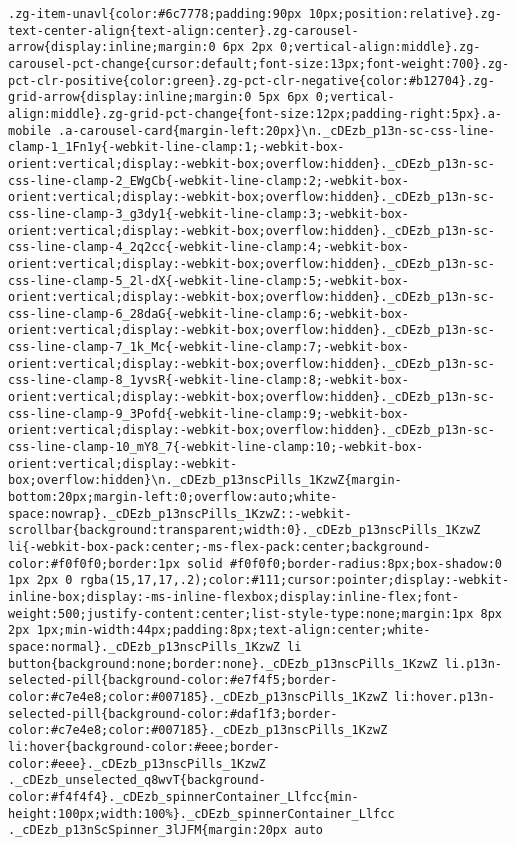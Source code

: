 \documentclass[
]{article}
\begin{document}
\begin{verbatim}
.zg-item-unavl{color:#6c7778;padding:90px 10px;position:relative}.zg-text-center-align{text-align:center}.zg-carousel-arrow{display:inline;margin:0 6px 2px 0;vertical-align:middle}.zg-carousel-pct-change{cursor:default;font-size:13px;font-weight:700}.zg-pct-clr-positive{color:green}.zg-pct-clr-negative{color:#b12704}.zg-grid-arrow{display:inline;margin:0 5px 6px 0;vertical-align:middle}.zg-grid-pct-change{font-size:12px;padding-right:5px}.a-mobile .a-carousel-card{margin-left:20px}\n._cDEzb_p13n-sc-css-line-clamp-1_1Fn1y{-webkit-line-clamp:1;-webkit-box-orient:vertical;display:-webkit-box;overflow:hidden}._cDEzb_p13n-sc-css-line-clamp-2_EWgCb{-webkit-line-clamp:2;-webkit-box-orient:vertical;display:-webkit-box;overflow:hidden}._cDEzb_p13n-sc-css-line-clamp-3_g3dy1{-webkit-line-clamp:3;-webkit-box-orient:vertical;display:-webkit-box;overflow:hidden}._cDEzb_p13n-sc-css-line-clamp-4_2q2cc{-webkit-line-clamp:4;-webkit-box-orient:vertical;display:-webkit-box;overflow:hidden}._cDEzb_p13n-sc-css-line-clamp-5_2l-dX{-webkit-line-clamp:5;-webkit-box-orient:vertical;display:-webkit-box;overflow:hidden}._cDEzb_p13n-sc-css-line-clamp-6_28daG{-webkit-line-clamp:6;-webkit-box-orient:vertical;display:-webkit-box;overflow:hidden}._cDEzb_p13n-sc-css-line-clamp-7_1k_Mc{-webkit-line-clamp:7;-webkit-box-orient:vertical;display:-webkit-box;overflow:hidden}._cDEzb_p13n-sc-css-line-clamp-8_1yvsR{-webkit-line-clamp:8;-webkit-box-orient:vertical;display:-webkit-box;overflow:hidden}._cDEzb_p13n-sc-css-line-clamp-9_3Pofd{-webkit-line-clamp:9;-webkit-box-orient:vertical;display:-webkit-box;overflow:hidden}._cDEzb_p13n-sc-css-line-clamp-10_mY8_7{-webkit-line-clamp:10;-webkit-box-orient:vertical;display:-webkit-box;overflow:hidden}\n._cDEzb_p13nscPills_1KzwZ{margin-bottom:20px;margin-left:0;overflow:auto;white-space:nowrap}._cDEzb_p13nscPills_1KzwZ::-webkit-scrollbar{background:transparent;width:0}._cDEzb_p13nscPills_1KzwZ li{-webkit-box-pack:center;-ms-flex-pack:center;background-color:#f0f0f0;border:1px solid #f0f0f0;border-radius:8px;box-shadow:0 1px 2px 0 rgba(15,17,17,.2);color:#111;cursor:pointer;display:-webkit-inline-box;display:-ms-inline-flexbox;display:inline-flex;font-weight:500;justify-content:center;list-style-type:none;margin:1px 8px 2px 1px;min-width:44px;padding:8px;text-align:center;white-space:normal}._cDEzb_p13nscPills_1KzwZ li button{background:none;border:none}._cDEzb_p13nscPills_1KzwZ li.p13n-selected-pill{background-color:#e7f4f5;border-color:#c7e4e8;color:#007185}._cDEzb_p13nscPills_1KzwZ li:hover.p13n-selected-pill{background-color:#daf1f3;border-color:#c7e4e8;color:#007185}._cDEzb_p13nscPills_1KzwZ li:hover{background-color:#eee;border-color:#eee}._cDEzb_p13nscPills_1KzwZ ._cDEzb_unselected_q8wvT{background-color:#f4f4f4}._cDEzb_spinnerContainer_Llfcc{min-height:100px;width:100%}._cDEzb_spinnerContainer_Llfcc ._cDEzb_p13nScSpinner_3lJFM{margin:20px auto 
\end{verbatim}
\end{document}
